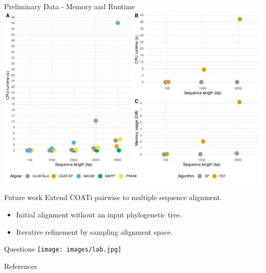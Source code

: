 \documentclass[aspectratio=169]{beamer}
\begin{document}
\begin{frame}{Preliminary Data - Memory and Runtime} %
\includegraphics[scale=0.45,center]{fig-benchmark.pdf}
\end{frame} %

\begin{frame}{Future work} %
Extend COATi pairwise to multiple sequence alignment.
\vspace{1em}
\begin{itemize}
	\setlength\itemsep{1em}
	\item Initial alignment without an input phylogenetic tree.
	\item Iterative refinement by sampling alignment space.
\end{itemize}
\end{frame} %

\begin{frame}{Questions} %
\texttt{[image: images/lab.jpg]}
\end{frame} %

\appendix %

\begin{frame}[t,allowframebreaks]{References} %
\printbibliography
\end{frame} %
\end{document}
